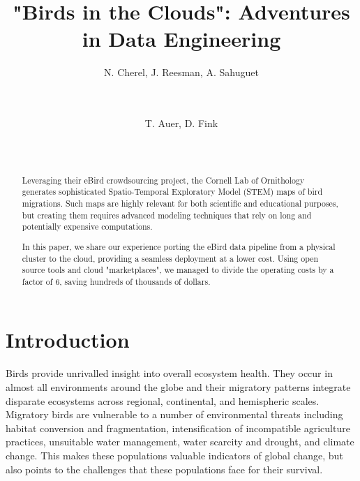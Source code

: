 \documentclass{acm_proc_article-sp}
\begin{document}

\title{"Birds in the Clouds": Adventures in Data Engineering}



\author{
\alignauthor
N. Cherel, J. Reesman, A. Sahuguet\\
       \\
       \\
\and
T. Auer,  D. Fink\\
       \\
       \\
}

\maketitle \begin{abstract}
Leveraging their eBird crowdsourcing project, the Cornell Lab of Ornithology generates sophisticated Spatio-Temporal Exploratory Model (STEM) maps of bird migrations. Such maps are highly relevant for both scientific and educational purposes, but creating them requires advanced modeling techniques that rely on long and potentially expensive computations.
    
In this paper, we share our experience porting the eBird data pipeline from a physical cluster to the cloud, providing a seamless deployment at a lower cost. Using open source tools and cloud "marketplaces", we managed to divide the operating costs by a factor of 6, saving  hundreds of thousands of dollars.
\end{abstract}

\section{Introduction}\label{sec::intro}
Birds provide unrivalled insight into overall ecosystem health. They occur in almost all environments around the globe and their migratory patterns integrate disparate ecosystems across regional, continental, and hemispheric scales. Migratory birds are vulnerable to a number of environmental threats including habitat conversion and fragmentation, intensification of incompatible agriculture practices, unsuitable water management, water scarcity and drought, and climate change. This makes these populations valuable indicators of global change, but also points to the challenges that these populations face for their survival.
\end{document}
